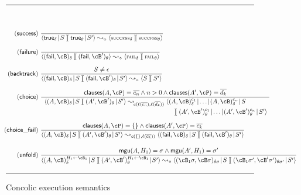 \documentclass[fleqn]{tlp}
\newcommand{\mgu}{\mathsf{mgu}}
\newcommand{\fail}{\mathsf{fail}}
\newcommand{\clauses}{\mathsf{clauses}}
\newcommand{\midd}{\!\mid\!}
\newcommand{\sep}{\mathit{\;]\![\;}}
\newcommand{\success}{\mbox{\footnotesize \textsc{success}}}
\newcommand{\failsc}{\mbox{\footnotesize \textsc{fail}}}
\def \tuple#1{\langle #1 \rangle}
\begin{document}
\begin{figure}[t]
  \rule{\linewidth}{1pt}\\[-1ex]
  \[
  \hspace{-2ex}\begin{array}{r@{~}l}
    \mathsf{(success)} & {\displaystyle 
      \frac{~~} 
        {\tuple{\mathsf{true}_\delta\midd S
            \sep\mathsf{true}_{\theta}\midd S'} 
          \leadsto_\diamond
          \tuple{\success_\delta \sep \success_\theta}}
        } \\[4ex]

    \mathsf{(failure)} & {\displaystyle 
      \frac{~} 
        {\tuple{(\mathsf{fail},\cB)_\delta
          \sep (\mathsf{fail},\cB')_\theta} \leadsto_\diamond 
        \tuple{\failsc_\delta \sep \failsc_\theta}}
        }\\[4ex]

    \mathsf{(backtrack)} & {\displaystyle 
      \frac{S\neq\epsilon} 
        {\tuple{(\mathsf{fail},\cB)_\delta\midd S \sep
          (\mathsf{fail},\cB')_\theta\midd S'} \leadsto_\diamond \tuple{S\sep S'}}
        }\\[4ex]

     \mathsf{(choice)} &  {\displaystyle 
      \frac{\clauses(A,\cP) = \ol{c_n}\wedge n>0 \wedge \clauses(A',\cP)=\ol{d_k}} 
        {\begin{array}{l@{~}l}
            \tuple{(A,\cB)_\delta\midd S \sep (A',\cB')_\theta\midd S'} 
            \leadsto_{\!c(\ell(\ol{c_n}),\ell(\ol{d_k}))} 
          \tuple{(A,\cB)_\delta^{c_1} \midd \ldots\midd
          (A,\cB)_\delta^{c_n}\midd  S\\[1ex]
        \hspace{47ex}\sep (A',\cB')_\theta^{c_1} \midd \ldots\midd
          (A',\cB')_\theta^{c_n}\midd  S'
        }\end{array}}
        }\\[8ex]


    \mathsf{(choice\_fail)} & {\displaystyle 
      \frac{ 
        \clauses(A,\cP)=\emptyset
      \wedge \clauses(A',\cP)=\ol{c_k}} 
        {\tuple{(A,\cB)_\delta\midd S \sep (A',\cB')_\theta\midd S'} 
          \leadsto_{c(\emptyset,\ell(\ol{c_k}))}
          \tuple{(\fail,\cB)_\delta\midd S\sep (\fail,\cB')_\theta\midd S'}}
        }\\[5ex]

    \mathsf{(unfold)} & {\displaystyle 
      \frac{\mgu(A,H_1)=\sigma\wedge\mgu(A',H_1)=\sigma'} 
        {\tuple{(A,\cB)_\delta^{H_1\leftarrow\cB_1}\midd S\sep
          (A',\cB')_\theta^{H_1\leftarrow\cB_1}\midd S'}
          \leadsto_\diamond \tuple{(\cB_1\sigma,\cB\sigma)_{\delta\sigma}\midd S
          \sep (\cB_1\sigma',\cB'\sigma')_{\theta\sigma'}\midd S'}}
        } \\ 

    \end{array}
    \]
  \rule{\linewidth}{1pt}
  \caption{Concolic execution semantics} \label{fig:concolic}
\end{figure}
\end{document}
